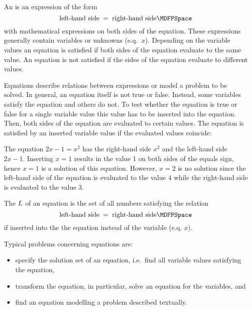 \begin{MIntro}
\begin{MInfo}
An  is an expression of the form
$$
\text{left-hand side} \;=\; \text{right-hand side} \MDFPSpace
$$
with mathematical expressions on both sides of the equation. These expressions generally contain variables or unknowns (e.q.\ $x$). 
Depending on the variable values an equation is satisfied if both sides of the equation evaluate to the same value. An equation is not 
satisfied if the sides of the equation evaluate to different values.
\end{MInfo}

Equations describe relations between expressions or model a problem to be solved.
In general, an equation itself is not true or false. Instead, some variables satisfy the equation and others do not. To test whether the equation is 
true or false for a single variable value this value has to be inserted into the equation. Then, both sides of the 
equation are evaluated to certain values. The equation is satisfied by an inserted variable value if the evaluated values coincide:

\begin{MExample}
The equation $2x-1=x^2$ has the right-hand side $x^2$ and the left-hand side $2x-1$. Inserting $x=1$ 
results in the value $1$ on both sides of the equals sign, hence $x=1$ is a solution of this equation. 
However, $x=2$ is no solution since the left-hand side of the equation is evaluated to the value $4$ while the 
right-hand side is evaluated to the value $3$.
\end{MExample}

\begin{MInfo}
The  $L$ of an equation is the set of all numbers satisfying the relation 
$$
\text{left-hand side} \;=\; \text{right-hand side} \MDFPSpace
$$
if inserted into the the equation instead of the variable (e.q. $x$).
\end{MInfo}

Typical problems concerning equations are:
\begin{itemize}
 \item{specify the solution set of an equation, i.e.\ find all variable values satisfying the equation,}
 \item{transform the equation, in particular, solve an equation for the variables, and}
 \item{find an equation modelling a problem described textually.}
\end{itemize}



\end{MIntro}
